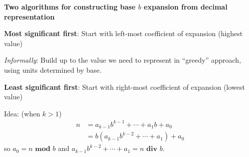 
{\bf Two algorithms for constructing base $b$ expansion from decimal representation}

{\bf Most significant first}: Start with left-most coefficient of expansion (highest value)

{\it Informally}: Build up to the value we need to represent in ``greedy'' approach, using 
units determined by base.

\vfill




\vfill
\vfill

\newpage
{\bf Least significant first}: Start with right-most coefficient of expansion (lowest value)

    Idea: {\tiny(when $k > 1$)} 
    \begin{align*}
      n &= a_{k-1} b^{k-1} + \cdots + a_1 b + a_0 \\
        &= b ( a_{k-1} b^{k-2} + \cdots + a_1) + a_0\end{align*}
    so $a_0 = n \textbf{ mod } b$ and $a_{k-1} b^{k-2} + \cdots + a_1 = n \textbf{ div } b$.





\vfill
\vfill
\newpage